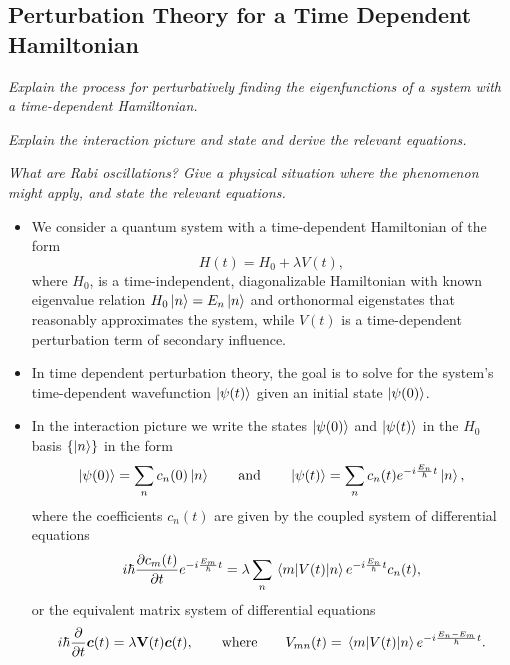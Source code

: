\documentclass[11pt, a4paper]{article}
\newcommand{\Ham}{Hamiltonian\xspace}
\renewcommand{\vec}[1]{\bm{#1}}  %
\newcommand{\mat}[1]{\mathbf{#1}}  %
\newcommand{\p}{\psi}  %
\begin{document}
\subsection{Perturbation Theory for a Time Dependent \Ham}
\textit{Explain the process for perturbatively finding the eigenfunctions of a system with a time-dependent \Ham.}

\vspace{2mm}
\textit{Explain the interaction picture and state and derive the relevant equations.}

\vspace{2mm}
\textit{What are Rabi oscillations? Give a physical situation where the phenomenon might apply, and state the relevant equations.}

\begin{itemize}
    \item We consider a quantum system with a time-dependent \Ham of the form
    \begin{equation*}
        H(t) = H_{0} + \lambda V(t),
    \end{equation*}
    where $ H_{0} $, is a time-independent, diagonalizable \Ham with known eigenvalue relation $ H_{0}\ket{n} = E_{n}\ket{n} $ and orthonormal eigenstates that reasonably approximates the system, while $ V(t) $ is a time-dependent perturbation term of secondary influence.

    \item In time dependent perturbation theory, the goal is to solve for the system's time-dependent wavefunction $ \ket{\psi(t)} $ given an initial state $ \ket{\psi(0)} $. 

    \item In the interaction picture we write the states $ \ket{\psi(0)} $ and $ \ket{\psi(t)} $ in the  $ H_{0} $ basis $ \{\ket{n}\} $ in the form
    \begin{equation*}
        \ket{\p(0)} = \sum_{n}c_{n}(0)\ket{n} \qquad \text{and} \qquad \ket{\psi(t)} = \sum_{n}c_{n}(t)e^{-i \frac{E_{n}}{\hbar}t}\ket{n},
    \end{equation*}
    where the coefficients $ c_{n}(t) $ are given by the coupled system of differential equations
    \begin{equation*}
        i \hbar \pdv{c_{m}(t)}{t}e^{-i \frac{E_{m}}{\hbar}t} = \lambda \sum_{n} \mel{m}{V(t)}{n}e^{-i \frac{E_{n}}{\hbar}t} c_{n}(t),
    \end{equation*}
    or the equivalent matrix system of differential equations
    \begin{equation*}
        i \hbar \pdv{t} \vec{c}(t) = \lambda \mat{V}(t) \vec{c}(t), \qquad \text{where} \qquad V_{mn}(t) = \mel{m}{V(t)}{n} e^{-i \frac{E_{n} - E_{m}}{\hbar}t}.
    \end{equation*}


\end{itemize}
\end{document}
